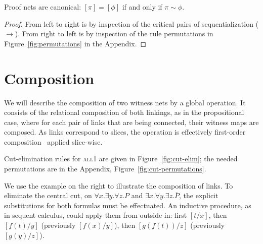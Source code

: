 \documentclass[UKenglish]{lipics-v2016}
\theoremstyle{plain}
\newcommand\all{\textsc{all}}
\newcommand\+{+}
\renewcommand\*{\times}
\newcommand\dual[1]{\overline{#1}}
\newcommand\scoal{\rightarrow} %
\begin{document}

\begin{theorem}
Proof nets are canonical: $[\pi]=[\phi]$ if and only if $\pi\sim\phi$.
\end{theorem}

\begin{proof}
From left to right is by inspection of the critical pairs of sequentialization ($\scoal$). From right to left is by inspection of the rule permutations in Figure~\ref{fig:permutations} in the Appendix.
\end{proof}



\section{Composition}

\newlength\seriously
\setlength\seriously\parindent
\parbox[b]{.6\columnwidth}{
We will describe the composition of two witness nets by a global operation. It consists of the relational composition of both linkings, as in the propositional case, where for each pair of links that are being connected, their witness maps are composed. As links correspond to slices, the operation is effectively first-order composition~\cite{Mimram-2011} applied slice-wise.

\setlength\parindent\seriously
\indent
Cut-elimination rules for \all1 are given in Figure~\ref{fig:cut-elim}; the needed permutations are in the Appendix, Figure~\ref{fig:cut-permutations}.
}
\quad
{}
\quad
{}

We use the example on the right to illustrate the composition of links. To eliminate the central cut, on $\forall x.\exists y.\forall z.P$ and $\exists x.\forall y.\exists z.\dual P$, the explicit substitutions for both formulas must be effectuated. An inductive procedure, as in sequent calculus, could apply them from outside in: first $[t/x]$, then $[f(t)/y]$ (previously $[f(x)/y]$), then $[g(f(t))/z]$ (previously $[g(y)/z]$). 
\end{document}
